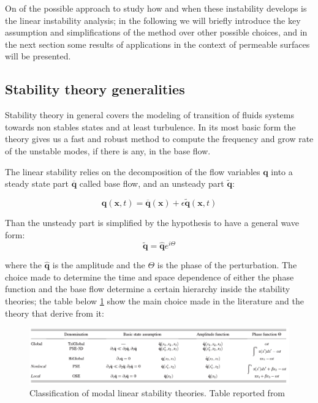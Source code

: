 On of the possible approach to study how and when these instability develops is the linear instability analysis; in the following we will briefly introduce the key assumption and simplifications of the method over other possible choices, and in the next section some results of applications in the context of permeable surfaces will be presented.


\subsection{Stability theory generalities}

Stability theory in general covers the modeling of transition of fluids systems towards non stables states and at least turbulence.
In its most basic form the theory gives us a fast and robust method to compute the frequency and grow rate of the unstable modes, if there is any, in the base flow.

The linear stability relies on the decomposition of the flow variables $\mathbf{q}$ into a steady state part $\overline{\mathbf{q}}$ called base flow, and an unsteady part $\widetilde{\mathbf{q}}$:

$$ \mathbf{q} (\mathbf{x},t)= \overline{\mathbf{q}} (\mathbf{x}) + \epsilon \widetilde{\mathbf{q}} (\mathbf{x},t) $$

Than the unsteady part is simplified by the hypothesis to have a general wave form:
$$  \widetilde{\mathbf{q}} =  \widehat{\mathbf{q}} e^{i\Theta} $$

where the $\widehat{\mathbf{q}}$ is the amplitude and the $\Theta$ is the phase of the perturbation.
The choice made to determine the time and space dependence of either the phase function and the base flow determine a certain hierarchy inside the stability theories; the table below \ref{fig:table} show the main choice made in the literature and the theory that derive from it:

\begin{figure}[h]
	\centering
	\includegraphics[width=1\linewidth]{chapter_1/table}
	\caption{Classification of modal linear stability theories. Table reported from \citet{juniper2014modal}}
	\label{fig:table}
\end{figure}
 
